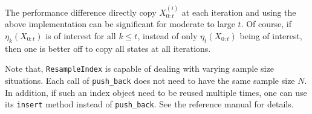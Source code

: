 The performance difference directly copy $X_{0:t}^{(i)}$ at each iteration and
using the above implementation can be significant for moderate to large $t$. Of
course, if $\eta_k(X_{0:t})$ is of interest for all $k \le t$, instead of only
$\eta_t(X_{0:t})$ being of interest, then one is better off to copy all states
at all iterations.

Note that, \verb|ResampleIndex| is capable of dealing with varying sample size
situations. Each call of \verb|push_back| does not need to have the same sample
size $N$. In addition, if such an index object need to be reused multiple
times, one can use its \verb|insert| method instead of \verb|push_back|. See
the reference manual for details.

